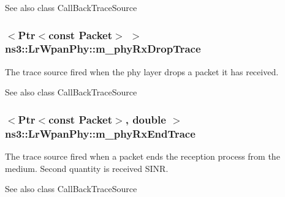 \begin{DoxySeeAlso}{See also}
class Call\+Back\+Trace\+Source 
\end{DoxySeeAlso}
\subsubsection[{\texorpdfstring{m\+\_\+phy\+Rx\+Drop\+Trace}{m_phyRxDropTrace}}]{$<${\bf Ptr}$<$const {\bf Packet}$>$ $>$ ns3\+::\+Lr\+Wpan\+Phy\+::m\+\_\+phy\+Rx\+Drop\+Trace\hspace{0.3cm}{\ttfamily [private]}}\hypertarget{classns3_1_1LrWpanPhy_aa649b07e1ef1151e1758c5091e6a7a00}{}\label{classns3_1_1LrWpanPhy_aa649b07e1ef1151e1758c5091e6a7a00}
The trace source fired when the phy layer drops a packet it has received.

\begin{DoxySeeAlso}{See also}
class Call\+Back\+Trace\+Source 
\end{DoxySeeAlso}
\subsubsection[{\texorpdfstring{m\+\_\+phy\+Rx\+End\+Trace}{m_phyRxEndTrace}}]{$<${\bf Ptr}$<$const {\bf Packet}$>$, double $>$ ns3\+::\+Lr\+Wpan\+Phy\+::m\+\_\+phy\+Rx\+End\+Trace\hspace{0.3cm}{\ttfamily [private]}}\hypertarget{classns3_1_1LrWpanPhy_a6d8ee60f128cdce862893fc9e0e5eda3}{}\label{classns3_1_1LrWpanPhy_a6d8ee60f128cdce862893fc9e0e5eda3}
The trace source fired when a packet ends the reception process from the medium. Second quantity is received S\+I\+NR.

\begin{DoxySeeAlso}{See also}
class Call\+Back\+Trace\+Source 
\end{DoxySeeAlso}
